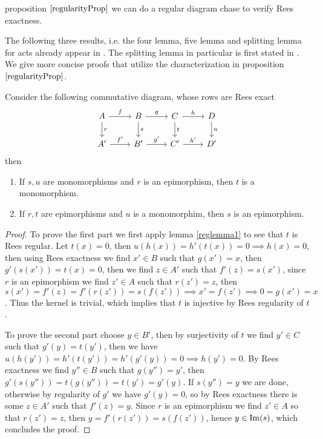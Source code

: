 proposition $\ref{regularityProp}$ we can do a regular diagram chase to verify Rees exactness.\par 
The following three results, i.e. the four lemma, five lemma and splitting lemma for acts already appear in \cite{Jafari19}. 
The splitting lemma in particular is first stated in \cite{Chen02}. We give more concise
proofs that utilize the characterization in proposition $\ref{regularityProp}$.
\begin{lemma}
    Consider the following commutative diagram, whose rows are Rees exact
    \[\begin{tikzcd}
        A & B & C & D \\
        {A'} & {B'} & {C'} & {D'}
        \arrow["f", from=1-1, to=1-2]
        \arrow["r", from=1-1, to=2-1]
        \arrow["g", from=1-2, to=1-3]
        \arrow["s", from=1-2, to=2-2]
        \arrow["h", from=1-3, to=1-4]
        \arrow["t", from=1-3, to=2-3]
        \arrow["u", from=1-4, to=2-4]
        \arrow["{f'}", from=2-1, to=2-2]
        \arrow["{g'}", from=2-2, to=2-3]
        \arrow["{h'}", from=2-3, to=2-4]
    \end{tikzcd}\]
    then
    \begin{enumerate}
        \item If $s,u$ are monomorphisms and $r$ is an epimorphism, then $t$ is a monomorphism.
        \item If $r,t$ are epimorphisms and $u$ is a monomorphim, then $s$ is an epimorphism.
    \end{enumerate}
\end{lemma}
\begin{proof}[Proof]
    To prove the first part we first apply lemma \ref{reglemma1} to see that $t$ is Rees regular. Let $t(x)=0$, then 
    $u(h(x)) = h'(t(x))=0 \implies h(x)=0$, then using Rees exactness we find $x'\in B$ such that $g(x')=x$, then 
    $g'(s(x')) = t(x) = 0$, then we find $z\in A'$ such that $f'(z)=s(x')$, since $r$ is an epimorphism we find $z'\in A$
    such that $r(z')=z$, then $s(x')=f'(z)=f'(r(z'))=s(f(z')) \implies x'=f(z') \implies 0=g(x')=x$. Thus the kernel is 
    trivial, which implies that $t$ is injective by Rees regularity of $t$. \par
    To prove the second part choose $y\in B'$, then by surjectivity of $t$ we find $y'\in C$ such that $g'(y)=t(y')$, then 
    we have $u(h(y')) = h'(t(y'))= h'(g'(y)) = 0 \implies h(y')=0$. By Rees exactness we find $y''\in B$ such that 
    $g(y'')=y'$, then $g'(s(y'')) = t(g(y'')) = t(y') = g'(y)$. If $s(y'')=y$ we are done, otherwise by regularity of $g'$ we 
    have $g'(y)=0$, so by Rees exactness there is some $z\in A'$ such that $f'(z)=y$. Since $r$ is an epimorphism we find $z'\in A$
    so that $r(z')=z$, then $y = f'(r(z')) = s(f(z'))$, hence $y\in\mathrm{Im}(s)$, which concludes the proof.
\end{proof}
